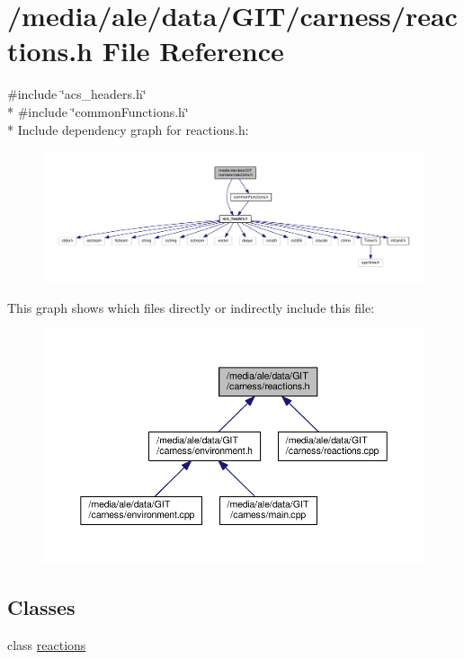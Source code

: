 \hypertarget{a00043}{\section{/media/ale/data/\-G\-I\-T/carness/reactions.h File Reference}
\label{a00043}
}
{\ttfamily \#include \char`\"{}acs\-\_\-headers.\-h\char`\"{}}\\*
{\ttfamily \#include \char`\"{}common\-Functions.\-h\char`\"{}}\\*
Include dependency graph for reactions.\-h\-:\nopagebreak
\begin{figure}[H]
\begin{center}
\leavevmode
\includegraphics[width=350pt]{a00077}
\end{center}
\end{figure}
This graph shows which files directly or indirectly include this file\-:\nopagebreak
\begin{figure}[H]
\begin{center}
\leavevmode
\includegraphics[width=350pt]{a00078}
\end{center}
\end{figure}
\subsection*{Classes}
\begin{DoxyCompactItemize}
\item 
class \hyperlink{a00021}{reactions}
\end{DoxyCompactItemize}
